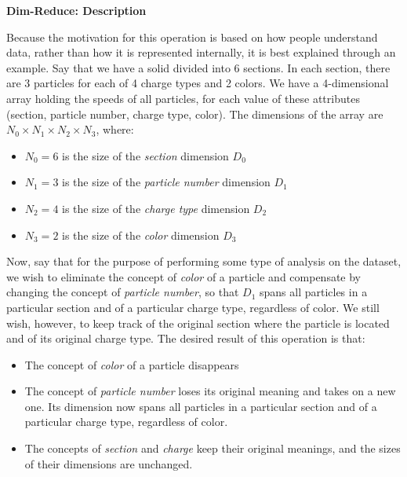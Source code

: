 \documentclass[conference]{IEEEtran}
\newcommand{\subsubsubsection}{\noindent\textbf}
\begin{document}
\subsubsubsection{Dim-Reduce: Description}

Because the motivation for this operation is based on how people understand
data, rather than how it is represented internally, it is best explained
through an example. Say that we have a solid divided into 6 sections. In each
section, there are 3 particles for each of 4 charge types and 2 colors. We have
a 4-dimensional array holding the speeds of all particles, for each value of
these attributes (section, particle number, charge type, color). The dimensions
of the array are $N_0{\times}N_1{\times}N_2{\times}N_3$, where:

\begin{itemize}

\item $N_0 = 6$ is the size of the {\em section} dimension $D_0$

\item $N_1 = 3$ is the size of the {\em particle number} dimension $D_1$

\item $N_2 = 4$ is the size of the {\em charge type} dimension $D_2$

\item $N_3 = 2$ is the size of the {\em color} dimension $D_3$

\end{itemize}

Now, say that for the purpose of performing some type of analysis on the
dataset, we wish to eliminate the concept of {\em color} of a particle and
compensate by changing the concept of {\em particle number}, so that $D_1$
spans all particles in a particular section and of a particular charge type,
regardless of color. We still wish, however, to keep track of the original
section where the particle is located and of its original charge type. The
desired result of this operation is that:

\begin{itemize}

\item The concept of {\em color} of a particle disappears

\item The concept of {\em particle number} loses its original meaning and takes
on a new one. Its dimension now spans all particles in a particular section and
of a particular charge type, regardless of color.

\item The concepts of {\em section} and {\em charge} keep their original
meanings, and the sizes of their dimensions are unchanged.

\end{itemize}
\end{document}

